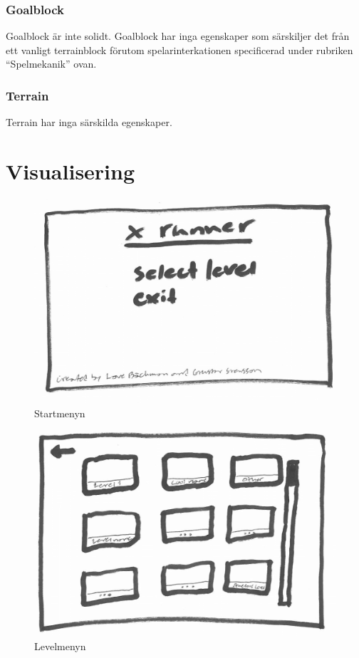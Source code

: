 \documentclass{TDP003mall}
\begin{document}
\subsubsection{Goalblock}
Goalblock är inte solidt. Goalblock har inga egenskaper som särskiljer det från ett vanligt terrainblock förutom spelarinterkationen specificerad under rubriken ``Spelmekanik'' ovan.

\subsubsection{Terrain}
Terrain har inga särskilda egenskaper.

\section{Visualisering}
\begin{figure}[!h]
  \centering
  \includegraphics[scale=0.30]{startmeny}
  \caption{Startmenyn}
  \label{Startmenyn}
\end{figure}

\begin{figure}[!h]
  \centering
  \includegraphics[scale=0.30]{levelmeny}
  \caption{Levelmenyn}
  \label{Levelmenyn}
\end{figure}
\end{document}
